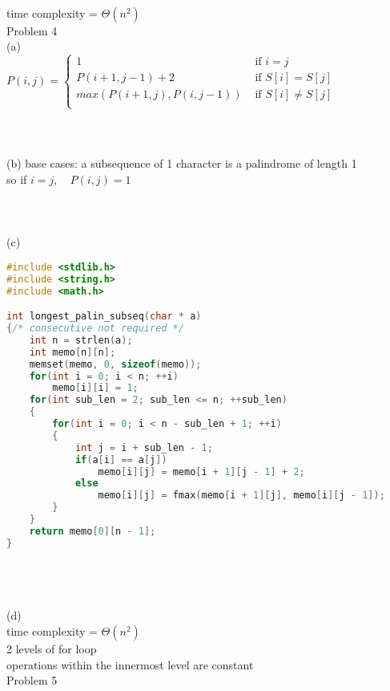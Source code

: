 \documentclass[12pt,border=4pt,multi]{article}%
\begin{document}
\leavevmode
\\
\\
\\
time complexity = $\Theta(n^2)$\\
\newpage
\noindent
Problem 4\\
(a)\\
$P(i, j) = 
\begin{cases}
1 & \text{ if } i = j\\
P(i + 1, j - 1) + 2 & \text{ if } S[i] = S[j]\\
max(P(i + 1, j), P(i, j - 1)) & \text{ if } S[i] \not= S[j]\\ 
\end{cases}$
\\
\\
\\
\\
(b)
base cases:
a subsequence of 1 character is a palindrome of length 1\\
so if $i = j,\quad P(i, j) = 1$\\
\\
\\
\\
(c)
\begin{lstlisting}[language = c]
#include <stdlib.h>
#include <string.h>
#include <math.h>

int longest_palin_subseq(char * a)
{/* consecutive not required */
    int n = strlen(a);
    int memo[n][n];
    memset(memo, 0, sizeof(memo));
    for(int i = 0; i < n; ++i)
        memo[i][i] = 1;
    for(int sub_len = 2; sub_len <= n; ++sub_len)
    {
        for(int i = 0; i < n - sub_len + 1; ++i)
        {
            int j = i + sub_len - 1;
            if(a[i] == a[j])
                memo[i][j] = memo[i + 1][j - 1] + 2;
            else
                memo[i][j] = fmax(memo[i + 1][j], memo[i][j - 1]);
        }
    }
    return memo[0][n - 1];
}
\end{lstlisting}
\leavevmode
\\
\\
\\
(d)\\
time complexity = $\Theta(n^2)$\\
2 levels of for loop\\
operations within the innermost level are constant\\
\newpage
\noindent
Problem 5
\end{document}
